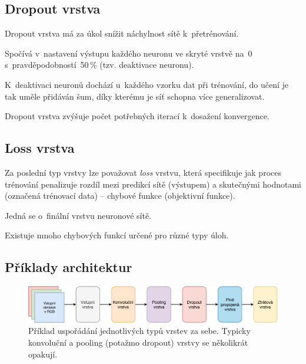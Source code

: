 \subsection{Dropout vrstva}

\begin{compactitem}
    \item Dropout vrstva má za úkol snížit náchylnost sítě k~přetrénování.

    \item Spočívá v~nastavení výstupu každého neuronu ve skryté vrstvě na~0 s~pravděpodobností~50\,\% (tzv. deaktivace neuronu).

    \item K~deaktivaci neuronů dochází u~každého vzorku dat při trénování, do učení je tak uměle přidáván šum, díky kterému je síť schopna více generalizovat.

    \item Dropout vrstva zvýšuje počet potřebných iterací k~dosažení konvergence.
\end{compactitem}

\subsection{Loss vrstva}

\begin{compactitem}
    \item Za poslední typ vrstvy lze považovat \textit{loss} vrstvu, která specifikuje jak proces trénování penalizuje rozdíl mezi predikcí sítě (výstupem) a skutečnými hodnotami (označená trénovací data) -- chybové funkce (objektivní funkce).

    \item Jedná se o~finální vrstvu neuronové sítě.

    \item Existuje mnoho chybových funkcí určené pro různé typy úloh.
\end{compactitem}

\subsection{Příklady architektur}

\begin{figure}[H]
    \centering
    \includegraphics[width=1\linewidth]{conv-arch.pdf}
    \caption{Příklad uspořádání jednotlivých typů vrstev za sebe. Typicky konvoluční a pooling (potažmo dropout) vrstvy se několikrát opakují.}
\end{figure}

